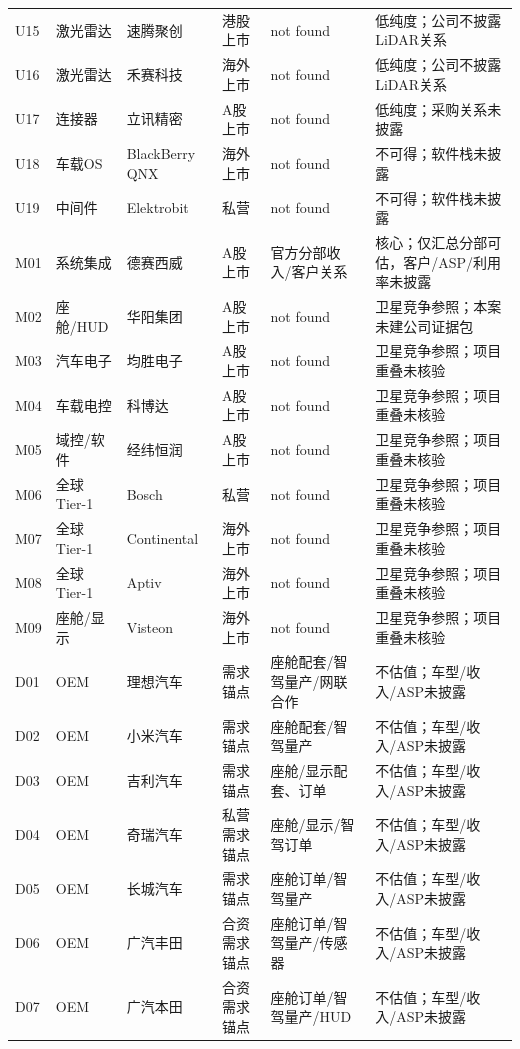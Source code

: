 \begin{longtable}{L{1.0cm}L{1.7cm}L{2.2cm}L{2.3cm}L{2.6cm}L{3.4cm}}
U15 & 激光雷达 & 速腾聚创 & 港股上市 & not found & 低纯度；公司不披露LiDAR关系 \\
U16 & 激光雷达 & 禾赛科技 & 海外上市 & not found & 低纯度；公司不披露LiDAR关系 \\
U17 & 连接器 & 立讯精密 & A股上市 & not found & 低纯度；采购关系未披露 \\
U18 & 车载OS & BlackBerry QNX & 海外上市 & not found & 不可得；软件栈未披露 \\
U19 & 中间件 & Elektrobit & 私营 & not found & 不可得；软件栈未披露 \\
M01 & 系统集成 & 德赛西威 & A股上市 & 官方分部收入/客户关系 & 核心；仅汇总分部可估，客户/ASP/利用率未披露 \\
M02 & 座舱/HUD & 华阳集团 & A股上市 & not found & 卫星竞争参照；本案未建公司证据包 \\
M03 & 汽车电子 & 均胜电子 & A股上市 & not found & 卫星竞争参照；项目重叠未核验 \\
M04 & 车载电控 & 科博达 & A股上市 & not found & 卫星竞争参照；项目重叠未核验 \\
M05 & 域控/软件 & 经纬恒润 & A股上市 & not found & 卫星竞争参照；项目重叠未核验 \\
M06 & 全球Tier-1 & Bosch & 私营 & not found & 卫星竞争参照；项目重叠未核验 \\
M07 & 全球Tier-1 & Continental & 海外上市 & not found & 卫星竞争参照；项目重叠未核验 \\
M08 & 全球Tier-1 & Aptiv & 海外上市 & not found & 卫星竞争参照；项目重叠未核验 \\
M09 & 座舱/显示 & Visteon & 海外上市 & not found & 卫星竞争参照；项目重叠未核验 \\
D01 & OEM & 理想汽车 & 需求锚点 & 座舱配套/智驾量产/网联合作 & 不估值；车型/收入/ASP未披露 \\
D02 & OEM & 小米汽车 & 需求锚点 & 座舱配套/智驾量产 & 不估值；车型/收入/ASP未披露 \\
D03 & OEM & 吉利汽车 & 需求锚点 & 座舱/显示配套、订单 & 不估值；车型/收入/ASP未披露 \\
D04 & OEM & 奇瑞汽车 & 私营需求锚点 & 座舱/显示/智驾订单 & 不估值；车型/收入/ASP未披露 \\
D05 & OEM & 长城汽车 & 需求锚点 & 座舱订单/智驾量产 & 不估值；车型/收入/ASP未披露 \\
D06 & OEM & 广汽丰田 & 合资需求锚点 & 座舱订单/智驾量产/传感器 & 不估值；车型/收入/ASP未披露 \\
D07 & OEM & 广汽本田 & 合资需求锚点 & 座舱订单/智驾量产/HUD & 不估值；车型/收入/ASP未披露 \\

\end{longtable}

